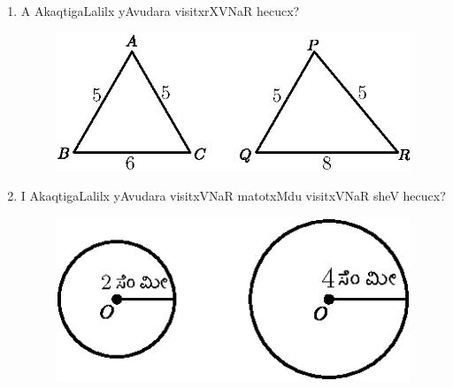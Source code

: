 \begin{enumerate}
\item A AkaqtigaLalilx yAvudara visitxrXVNaR hecucx?
\begin{figure}[H]
\centering
\includegraphics{src/figures/exr46.eps}
\end{figure}

\item I AkaqtigaLalilx yAvudara visitxVNaR matotxMdu visitxVNaR sheV hecucx?
\begin{figure}[H]
\centering
\includegraphics{src/figures/exr47.eps}
\end{figure}

\end{enumerate}
